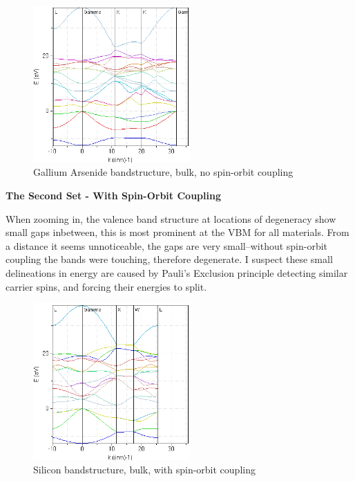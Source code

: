 \documentclass{IEEEtran}
\begin{document}
\begin{figure}[!ht] 
    \centering
    \includegraphics*[width = 6cm]{gaas-bands-firstset.png}
    \caption{Gallium Arsenide bandstructure, bulk, no spin-orbit coupling}
    \label{fig:gaas-first-set}
\end{figure}    

\bigskip

\textbf{The Second Set - With Spin-Orbit Coupling}

When zooming in, the valence band structure at locations of degeneracy show small gaps inbetween, this is most prominent at the VBM for all materials. From a distance it seems unnoticeable, the gaps are very small--without spin-orbit coupling the bands were touching, therefore degenerate. I suspect these small delineations in energy are caused by Pauli's Exclusion principle detecting similar carrier spins, and forcing their energies to split.

\begin{figure}[!ht] 
    \centering
    \includegraphics*[width = 6cm]{si-bands-secondset.png}
    \caption{Silicon bandstructure, bulk, with spin-orbit coupling}
    \label{fig:si-second-set}
\end{figure}    
\end{document}

